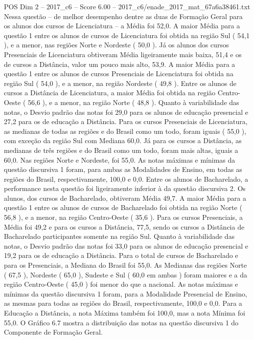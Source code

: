 \begin{textsample}{POS Dim 2 – 2017\_c6 – Score 6.00 – 2017\_c6/enade\_2017\_mat\_67a6a38461.txt}
Nessa questão – de melhor desempenho dentre as duas de Formação Geral para os alunos dos cursos de Licenciatura – a Média foi 52,0.
A maior Média para a questão 1 entre os alunos de cursos de Licenciatura foi obtida na região Sul ( 54,1 ), e a menor, nas regiões Norte e Nordeste ( 50,0 ).
Já os alunos dos cursos Presenciais de Licenciatura obtiveram Média ligeiramente mais baixa, 51,4 e os de cursos a Distância, valor um pouco mais alto, 53,9.
A maior Média para a questão 1 entre os alunos de cursos Presenciais de Licenciatura foi obtida na região Sul ( 54,0 ), e a menor, na região Nordeste ( 49,8 ).
Entre os alunos de cursos a Distância de Licenciatura, a maior Média foi obtida na região Centro-Oeste ( 56,6 ), e a menor, na região Norte ( 48,8 ).
Quanto à variabilidade das notas, o Desvio padrão das notas foi 29,0 para os alunos de educação presencial e 27,2 para os de educação a Distância.
Para os cursos Presenciais de Licenciatura, as medianas de todas as regiões e do Brasil como um todo, foram iguais ( 55,0 ), com exceção da região Sul com Mediana 60,0.
Já para os cursos a Distância, as medianas de três regiões e do Brasil como um todo, foram mais altas, iguais a 60,0.
Nas regiões Norte e Nordeste, foi 55,0.
As notas máximas e mínimas da questão discursiva 1 foram, para ambas as Modalidades de Ensino, em todas as regiões do Brasil, respectivamente, 100,0 e 0,0.
Entre os alunos de Bacharelado, a performance nesta questão foi ligeiramente inferior à da questão discursiva 2.
Os alunos, dos cursos de Bacharelado, obtiveram Média 49,7.
A maior Média para a questão 1 entre os alunos de cursos de Bacharelado foi obtida na região Norte ( 56,8 ), e a menor, na região Centro-Oeste ( 35,6 ).
Para os cursos Presenciais, a Média foi 49,2 e para os cursos a Distância, 77,5, sendo os cursos a Distância de Bacharelado participantes somente na região Sul.
Quanto à variabilidade das notas, o Desvio padrão das notas foi 33,0 para os alunos de educação presencial e 19,2 para os de educação a Distância.
Para o total de cursos de Bacharelado e para os Presenciais, a Mediana do Brasil foi 55,0.
As Medianas das regiões Norte ( 67,5 ), Nordeste ( 65,0 ), Sudeste e Sul ( 60,0 em ambas ) foram maiores e a da região Centro-Oeste ( 45,0 ) foi menor do que a nacional.
As notas máximas e mínimas da questão discursiva 1 foram, para a Modalidade Presencial de Ensino, as mesmas para todas as regiões do Brasil, respectivamente, 100,0 e 0,0.
Para a Educação a Distância, a nota Máxima também foi 100,0, mas a nota Mínima foi 55,0.
O Gráfico 6.7 mostra a distribuição das notas na questão discursiva 1 do Componente de Formação Geral.

\end{textsample}
